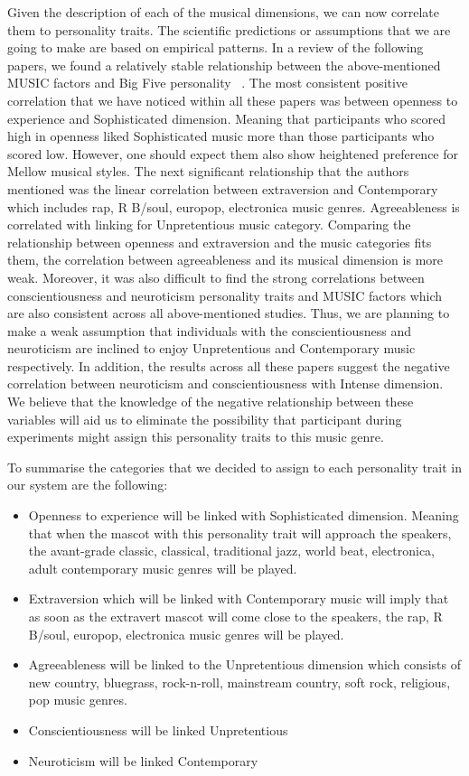 Given the description of each of the musical dimensions, we can now correlate them to personality traits.
The scientific predictions or assumptions that we are going to make are based on empirical patterns.
In a review of the following papers, we found a relatively stable relationship between the
above-mentioned MUSIC factors and Big Five
personality ~\cite{schafer2017can,bonneville2013music,fricke2017personality,greenberg2016song,langmeyer2012music}.
The most consistent positive correlation that we have noticed within all these papers was
between openness to experience and Sophisticated dimension.
Meaning that participants who scored high in openness liked
Sophisticated music more than those participants who scored low.
However, one should expect them also show heightened preference for Mellow musical styles.
The next significant relationship that the authors mentioned was the linear correlation between
extraversion and Contemporary which includes rap, R B/soul, europop, electronica music genres.
Agreeableness is correlated with linking for Unpretentious music category.
Comparing the relationship between openness and extraversion and the music categories fits them,
the correlation between agreeableness and its musical dimension is more weak.
Moreover, it was also difficult to find the strong correlations between
conscientiousness and neuroticism personality traits and MUSIC factors which are
also consistent across all above-mentioned studies.
Thus, we are planning to make a weak assumption that individuals with the
conscientiousness and neuroticism are inclined to enjoy Unpretentious and Contemporary music respectively.
In addition, the results across all these papers suggest the negative correlation between
neuroticism and conscientiousness with Intense dimension.
We believe that the knowledge of the negative relationship between these variables will aid us to eliminate
the possibility that participant during experiments might assign this personality traits to this music genre.

To summarise the categories that we decided to assign to each personality trait in our system are the following:
\begin{itemize}
\item Openness to experience will be linked with Sophisticated dimension.
      Meaning that when the mascot with this personality trait will approach the speakers,
      the avant-grade classic, classical, traditional jazz, world beat, electronica, adult
      contemporary music genres will be played.
\item Extraversion which will be linked with Contemporary music will imply that as soon as the extravert
      mascot will come close to the speakers, the rap, R B/soul, europop, electronica music genres will be played.
\item Agreeableness will be linked to the Unpretentious dimension which consists of new country,
      bluegrass, rock-n-roll, mainstream country, soft rock, religious, pop music genres.
\item Conscientiousness will be linked Unpretentious
\item Neuroticism will be linked Contemporary
\end{itemize}

